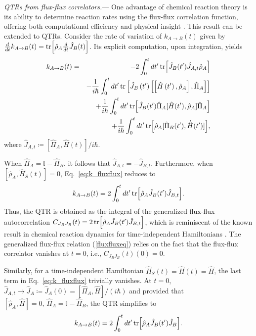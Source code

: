 \documentclass[prl,aps,amssymb,twocolumn,superscriptaddress, notitlepage, longbibliography]{revtex4-2}
\begin{document}
{\it QTRs from flux-flux correlators.}---
One advantage of chemical reaction theory is its ability to determine reaction rates using the flux-flux correlation function, offering both computational efficiency and physical insight \cite{Makarov2015,Miller83,Schatz02}. This result can be extended to QTRs.
Consider the rate of variation of $k_{A\rightarrow B}(t)$ given by $ \frac{d}{dt}k_{A\rightarrow B}(t)=\tr[\hat{\rho}_A\frac{d}{dt}\hat{J}_B(t)]$. Its explicit computation, upon integration, yields
\begin{eqnarray}\label{eq:k_fluxflux}
    k_{A\rightarrow B}(t)&=&-2\int_{0}^t dt'

    \tr[\hat{J}_B(t')
    \hat{J}_{A, t}

    \hat{\rho}_A]
    \nonumber\\
    & &
    -
    \frac{1}{i \hbar} \int_{0}^t d t'
    \tr \left\lbrack
    \hat{J}_B \left( t' \right)
    \left\lbrack
    \left\lbrack
    \hat{H} \left( t' \right)
    ,
    \hat{\rho}_A
    \right\rbrack
    ,
    \hat{\Pi}_A
    \right\rbrack
    \right\rbrack
    \nonumber\\
    & & +
    \frac{1}{i\hbar}\int_{0}^tdt'
    \tr[\hat{J}_B(t')\hat{\Pi}_A[\hat{H}(t'),\hat{\rho}_A]\hat{\Pi}_A]
    \nonumber\\
    & & +
    \frac{1}{i\hbar}\int_{0}^tdt'
    \tr[\hat{\rho}_A[\hat{\Pi}_B(t'),\dot{\hat{H}}(t')]]
    ,
\end{eqnarray}
where
$
\hat{J}_{A,t}
\coloneqq
\left\lbrack
\hat{\Pi}_A, \hat{H} \left( t \right)
\right\rbrack / i \hbar
$.

When $\hat{\Pi}_A=\mathbb{I}-\hat{\Pi}_B$, it follows that
$\hat{J}_{A,t} = -\hat{J}_{B,t}$.
Furthermore, when $[\hat{\rho}_A,\hat{H}_S(t)]=0$, Eq.~\eqref{eq:k_fluxflux} reduces to
\begin{eqnarray}
    k_{A\rightarrow B}(t)=2\int_0^t dt'

    \tr[\hat{\rho}_A \hat{J}_B(t')\hat{J}_{B,t}].
    \label{fluxfluxeq}
\end{eqnarray}
Thus, the QTR is obtained as the integral of the generalized flux-flux autocorrelation $C_{J_BJ_B}(t)=2\tr[\hat{\rho}_A \hat{J}_B(t')\hat{J}_{B,t}]$, which is reminiscent of the known result in chemical reaction dynamics for time-independent Hamiltonians \cite{Miller83}.
The generalized flux-flux relation (\ref{fluxfluxeq}) relies on the fact that
the flux-flux correlator vanishes at $t=0$, i.e., $C_{J_BJ_B}(t) \left( 0 \right) =0$.

Similarly, for a time-independent Hamiltonian $\hat H_S(t)=\hat H(t)=\hat H$, the last term in Eq.~\eqref{eq:k_fluxflux} trivially vanishes. At $t=0$, $\hat J_{A,t}\rightarrow \hat J_A\coloneqq \hat J_A(0)=\left[\hat\Pi_A,\hat H\right]/(i\hbar)$ and provided that $\left[\hat\rho_A,\hat H\right]=0,\,\hat\Pi_A=\mathbb I-\hat\Pi_B$, the QTR simplifies to
\begin{eqnarray}
    k_{A\rightarrow B}(t)=2\int_0^t dt'

    \tr[\hat{\rho}_A \hat{J}_B(t')\hat{J}_B].
    \label{fluxfluxeq_timeindep}
\end{eqnarray}
\end{document}
